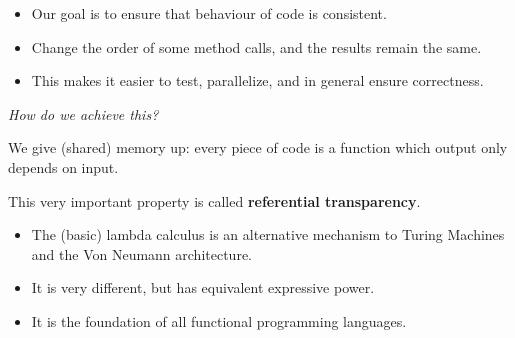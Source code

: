 \documentclass{beamer}
\begin{document}
\begin{frame}[fragile]{\CurrentSection}
\begin{block}{\CurrentSubSection}
\begin{itemize}
\item Our goal is to ensure that behaviour of code is consistent.
\item Change the order of some method calls, and the results remain the same.
\item This makes it easier to test, parallelize, and in general ensure correctness.

\end{itemize}

\end{block}


\end{frame}

\begin{frame}[fragile]{\CurrentSection}
\begin{exampleblock}{}
\textit{How do we achieve this?}
\end{exampleblock}

 
\pause 
\begin{exampleblock}{}
We give (shared) memory up: every piece of code is a function which output only depends on input.
\end{exampleblock}

 
\begin{exampleblock}{}
This very important property is called \textbf{referential transparency}.
\end{exampleblock}

 

\end{frame}

\begin{frame}[fragile]{\CurrentSection}
\begin{block}{\CurrentSubSection}
\begin{itemize}
\item The (basic) lambda calculus is an alternative mechanism to Turing Machines and the Von Neumann architecture.
\item It is very different, but has equivalent expressive power.
\item It is the foundation of all functional programming languages.

\end{itemize}

\end{block}


\end{frame}
\end{document}
